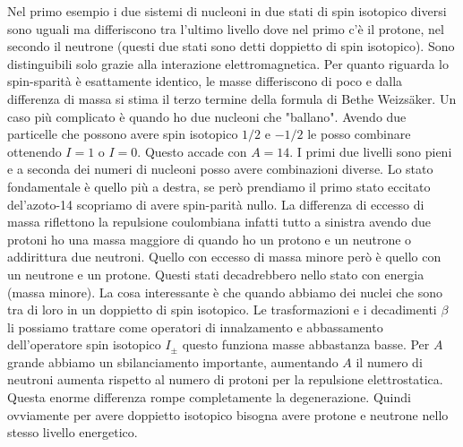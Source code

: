Nel primo esempio i due sistemi di nucleoni in due stati di spin isotopico diversi sono uguali ma differiscono tra l'ultimo livello dove nel primo c'è il protone, nel secondo il neutrone (questi due stati sono detti doppietto di spin isotopico). Sono distinguibili solo grazie alla interazione elettromagnetica. Per quanto riguarda lo spin-sparità è esattamente identico, le masse differiscono di poco e dalla differenza di massa si stima il terzo termine della formula di Bethe Weizs\"aker. Un caso più complicato è quando ho due nucleoni che "ballano". Avendo due particelle che possono avere spin isotopico $1/2$ e $-1/2$ le posso combinare ottenendo $I=1$ o $I=0$. Questo accade con $A=14$. I primi due livelli sono pieni e a seconda dei numeri di nucleoni posso avere combinazioni diverse. Lo stato fondamentale è quello più a destra, se però prendiamo il primo stato eccitato del'azoto-14 scopriamo di avere spin-parità nullo. La differenza di eccesso di massa riflettono la repulsione coulombiana infatti tutto a sinistra avendo due protoni ho una massa maggiore di quando ho un protono e un neutrone o addirittura due neutroni. Quello con eccesso di massa minore però è quello con un neutrone e un protone. Questi stati decadrebbero nello stato con energia (massa minore). La cosa interessante è che quando abbiamo dei nuclei che sono tra di loro in un doppietto di spin isotopico. Le trasformazioni e i decadimenti $\beta$ li possiamo trattare come operatori di innalzamento e abbassamento dell'operatore spin isotopico $I_\pm$ questo funziona masse abbastanza basse. Per $A$ grande abbiamo un sbilanciamento importante, aumentando $A$ il numero di neutroni aumenta rispetto al numero di protoni per la repulsione elettrostatica. Questa enorme differenza rompe completamente la degenerazione. Quindi ovviamente per avere doppietto isotopico bisogna avere protone e neutrone nello stesso livello energetico.
